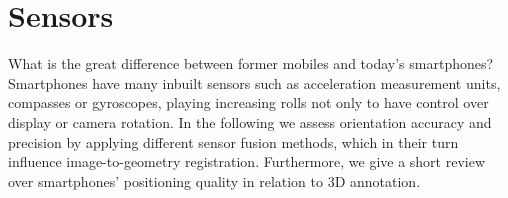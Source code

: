 \documentclass[review]{elsarticle}
\begin{document}
%

\section{Sensors}
\label{sec:technology:sensors}

What is the great difference between former mobiles and today's smartphones? Smartphones have many inbuilt sensors such as acceleration measurement units, compasses or gyroscopes, playing increasing rolls not only to have control over display or camera rotation. In the following we assess orientation accuracy and precision by applying different sensor fusion methods, which in their turn influence image-to-geometry registration. Furthermore, we give a short review over smartphones' positioning quality in relation to 3D annotation.
\end{document}
